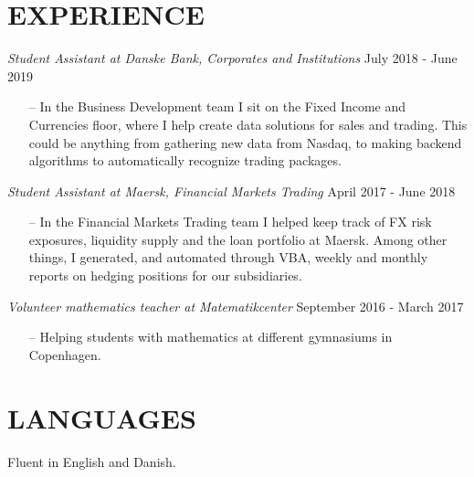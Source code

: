 \documentclass[margin, 10pt]{res} %
\begin{document}
\begin{resume}

\section{EXPERIENCE}

{\sl Student Assistant at Danske Bank, Corporates
and Institutions } \hfill July 2018 - June 2019 \\ 
\begin{itemize}
\item[--] In the Business Development team I sit on the Fixed Income and Currencies floor, where I help create data solutions for sales and trading. This could be anything from gathering new data from Nasdaq, to making backend algorithms to automatically recognize trading packages.\\
\end{itemize}
{\sl Student Assistant at Maersk, Financial Markets Trading} \hfill April 2017 - June 2018 \\ 
\begin{itemize}
\item[--] In the Financial Markets Trading team I helped keep track of FX risk exposures, liquidity supply and the loan portfolio at Maersk. Among other things, I generated, and automated through VBA, weekly and monthly reports on hedging positions for our subsidiaries.
\end{itemize}
{\sl Volunteer mathematics teacher at Matematikcenter} \hfill September 2016 - March 2017 \\
\begin{itemize}
\item[--] Helping students with mathematics at different gymnasiums in Copenhagen.
\end{itemize}
\section{LANGUAGES}


Fluent in English and Danish.



 









\end{resume}
\end{document}
